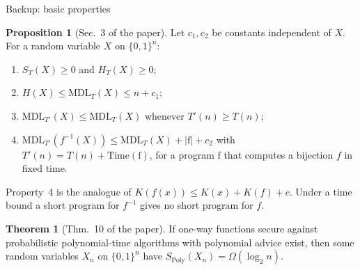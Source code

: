 \documentclass[aspectratio=169,notheorems]{beamer}
\theoremstyle{definition}
\newtheorem{theorem}{Theorem}
\newtheorem{proposition}{Proposition}
\newcommand{\MDL}{\mathrm{MDL}}
\newcommand{\Poly}{\mathrm{Poly}}
\begin{document}
\begin{frame}{Backup: basic properties}
\begin{proposition}[Sec.~3 of the paper]
Let $c_1,c_2$ be constants independent of $X$. For a random variable $X$ on $\{0,1\}^n$:
\begin{enumerate}
\item $S_T(X)\ge0$ and $H_T(X)\ge0$;
\item $H(X)\le\MDL_T(X)\le n+c_1$;
\item $\MDL_{T'}(X)\le\MDL_T(X)$ whenever $T'(n)\ge T(n)$;
\item $\MDL_{T'}(f^{-1}(X))\le\MDL_T(X)+|\mathrm f|+c_2$ with $T'(n)=T(n)+\mathrm{Time}(\mathrm f)$, for a program $\mathrm f$ that computes a bijection $f$ in fixed time.
\end{enumerate}
\end{proposition}
Property~4 is the analogue of $K(f(x))\le K(x)+K(f)+c$. Under a time bound a short program for $f^{-1}$ gives no short program for $f$.
\begin{theorem}[Thm.~10 of the paper]
If one-way functions secure against probabilistic polynomial-time algorithms with polynomial advice exist, then some random variables $X_n$ on $\{0,1\}^n$ have $S_{\Poly}(X_n)=\Omega(\log_2 n)$.
\end{theorem}
\end{frame}
\end{document}
